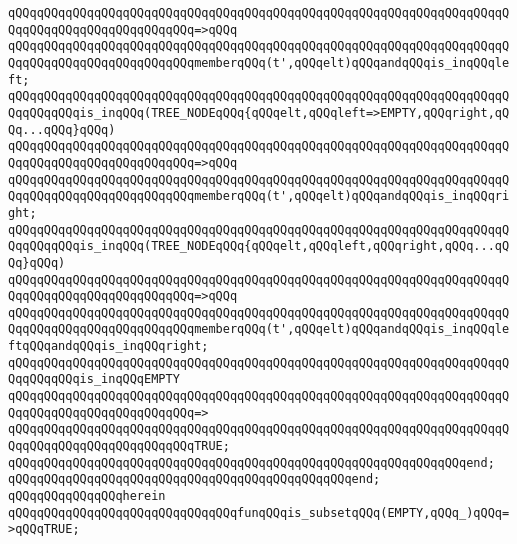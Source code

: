 \verb|qQQqqQQqqQQqqQQqqQQqqQQqqQQqqQQqqQQqqQQqqQQqqQQqqQQqqQQqqQQqqQQqqQQqqQQqqQQqqQQqqQQqqQQqqQQqqQQq=>qQQq|\newline
\verb|qQQqqQQqqQQqqQQqqQQqqQQqqQQqqQQqqQQqqQQqqQQqqQQqqQQqqQQqqQQqqQQqqQQqqQQqqQQqqQQqqQQqqQQqqQQqqQQqmemberqQQq(t',qQQqelt)qQQqandqQQqis_inqQQqleft;|\newline
\newline
\verb|qQQqqQQqqQQqqQQqqQQqqQQqqQQqqQQqqQQqqQQqqQQqqQQqqQQqqQQqqQQqqQQqqQQqqQQqqQQqqQQqis_inqQQq(TREE_NODEqQQq{qQQqelt,qQQqleft=>EMPTY,qQQqright,qQQq...qQQq}qQQq)|\newline
\verb|qQQqqQQqqQQqqQQqqQQqqQQqqQQqqQQqqQQqqQQqqQQqqQQqqQQqqQQqqQQqqQQqqQQqqQQqqQQqqQQqqQQqqQQqqQQqqQQq=>qQQq|\newline
\verb|qQQqqQQqqQQqqQQqqQQqqQQqqQQqqQQqqQQqqQQqqQQqqQQqqQQqqQQqqQQqqQQqqQQqqQQqqQQqqQQqqQQqqQQqqQQqqQQqmemberqQQq(t',qQQqelt)qQQqandqQQqis_inqQQqright;|\newline
\newline
\verb|qQQqqQQqqQQqqQQqqQQqqQQqqQQqqQQqqQQqqQQqqQQqqQQqqQQqqQQqqQQqqQQqqQQqqQQqqQQqqQQqis_inqQQq(TREE_NODEqQQq{qQQqelt,qQQqleft,qQQqright,qQQq...qQQq}qQQq)|\newline
\verb|qQQqqQQqqQQqqQQqqQQqqQQqqQQqqQQqqQQqqQQqqQQqqQQqqQQqqQQqqQQqqQQqqQQqqQQqqQQqqQQqqQQqqQQqqQQqqQQq=>qQQq|\newline
\verb|qQQqqQQqqQQqqQQqqQQqqQQqqQQqqQQqqQQqqQQqqQQqqQQqqQQqqQQqqQQqqQQqqQQqqQQqqQQqqQQqqQQqqQQqqQQqqQQqmemberqQQq(t',qQQqelt)qQQqandqQQqis_inqQQqleftqQQqandqQQqis_inqQQqright;|\newline
\newline
\verb|qQQqqQQqqQQqqQQqqQQqqQQqqQQqqQQqqQQqqQQqqQQqqQQqqQQqqQQqqQQqqQQqqQQqqQQqqQQqqQQqis_inqQQqEMPTY|\newline
\verb|qQQqqQQqqQQqqQQqqQQqqQQqqQQqqQQqqQQqqQQqqQQqqQQqqQQqqQQqqQQqqQQqqQQqqQQqqQQqqQQqqQQqqQQqqQQqqQQq=>|\newline
\verb|qQQqqQQqqQQqqQQqqQQqqQQqqQQqqQQqqQQqqQQqqQQqqQQqqQQqqQQqqQQqqQQqqQQqqQQqqQQqqQQqqQQqqQQqqQQqqQQqTRUE;|\newline
\verb|qQQqqQQqqQQqqQQqqQQqqQQqqQQqqQQqqQQqqQQqqQQqqQQqqQQqqQQqqQQqqQQqend;|\newline
\verb|qQQqqQQqqQQqqQQqqQQqqQQqqQQqqQQqqQQqqQQqqQQqqQQqend;|\newline
\newline
\verb|qQQqqQQqqQQqqQQqherein|\newline
\newline
\verb|qQQqqQQqqQQqqQQqqQQqqQQqqQQqqQQqfunqQQqis_subsetqQQq(EMPTY,qQQq_)qQQq=>qQQqTRUE;|\newline
